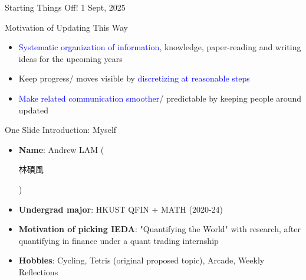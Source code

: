 \documentclass[xcolor=dvipsnames]{beamer}
\begin{document}
\customtitle
{Starting Things Off!}
{1 Sept, 2025}

\begin{frame}{Motivation of Updating This Way}
    \begin{itemize}
    \item \textcolor{blue}{Systematic organization of information}, knowledge, paper-reading and writing ideas for the upcoming years 
    \item Keep progress/ moves visible by \textcolor{blue}{discretizing at reasonable steps}
    \item \textcolor{blue}{Make related communication smoother}/ predictable by keeping people around updated
    \end{itemize}
\end{frame}

\begin{frame}{One Slide Introduction: Myself}
    \begin{itemize}
    \item \textbf{Name}: Andrew LAM (\begin{CJK*}{UTF8}{bsmi}林碩風\end{CJK*})
    \item \textbf{Undergrad major}: HKUST QFIN + MATH (2020-24)
    \item \textbf{Motivation of picking IEDA}: 
        "Quantifying the World" with research, 
        after quantifying in finance under a quant trading internship
    \item \textbf{Hobbies}:
        Cycling, Tetris (original proposed topic), Arcade, Weekly Reflections
    \end{itemize}
\end{frame}
\end{document}
